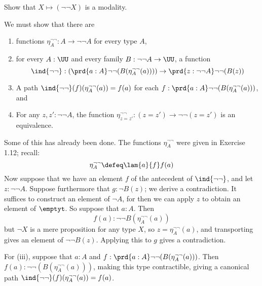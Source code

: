 Show that $X \mapsto (\lnot \lnot X)$ is a modality.


 \soln
We must show that there are
\begin{enumerate}
  \item functions $\eta^{\lnot \lnot}_{A} : A \to \lnot\lnot A$ for every type
  $A$,
  \item for every $A : \UU$ and every family $B : \lnot\lnot A \to \UU$, a
  function
  \[
    \ind{\lnot\lnot} : 
    \left(\prd{a : A}\lnot\lnot(B(\eta^{\lnot\lnot}_{A}(a)))\right)
    \to
    \prd{z : \lnot\lnot A}\lnot\lnot(B(z))
  \]
  \item A path $\ind{\lnot\lnot}(f)(\eta^{\lnot\lnot}_{A}(a)) = f(a)$ for each
  $f : \prd{a : A}\lnot\lnot(B(\eta^{\lnot\lnot}_{A}(a)))$, and
  \item For any $z, z' : \lnot \lnot A$, the function $\eta^{\lnot\lnot}_{z =
  z'} : (z = z') \to \lnot\lnot(z = z')$ is an equivalence.
\end{enumerate}
Some of this has already been done.  The functions $\eta^{\lnot\lnot}_{A}$ were
given in Exercise 1.12; recall:
\[
  \eta^{\lnot\lnot}_{A} \defeq \lam{a}{f}f(a)
\]
Now suppose that we have an element $f$ of the antecedent of
$\ind{\lnot\lnot}$, and let $z : \lnot\lnot A$.  Suppose furthermore
that $g : \lnot B(z)$; we derive a contradiction.  It suffices to
construct an element of $\lnot A$, for then we can apply $z$ to obtain
an element of $\emptyt$.  So suppose that $a : A$.  Then 
\[
  f(a) : \lnot \lnot B(\eta^{\lnot\lnot}_{A}(a))
\]
but $\lnot X$ is a mere proposition for any type $X$, so $z =
\eta^{\lnot\lnot}_{A}(a)$, and transporting gives an element of $\lnot \lnot
B(z)$.  Applying this to $g$ gives a contradiction.


For (iii), suppose that $a : A$ and $f : \prd{a :
A}\lnot\lnot(B(\eta^{\lnot\lnot}_{A}(a)))$.  Then $f(a) : \lnot \lnot
(B(\eta^{\lnot\lnot}_{A}(a)))$, making this type contractible, giving a
canonical path $\ind{\lnot\lnot}(f)(\eta^{\lnot\lnot}_{A}(a)) = f(a)$.



